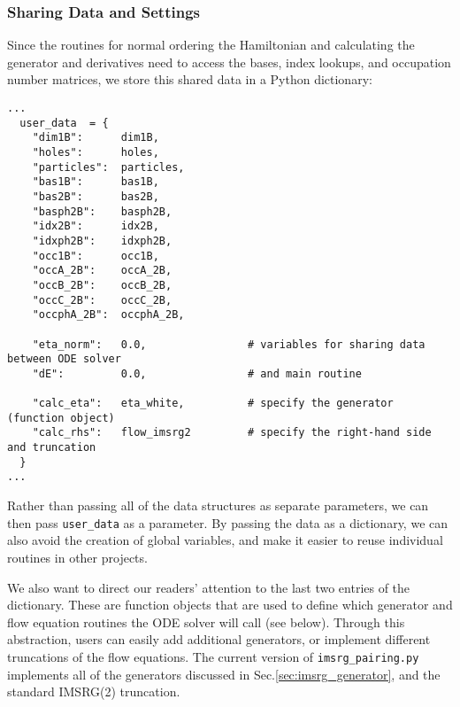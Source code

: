 \subsubsection*{Sharing Data and Settings}
Since the routines for normal ordering the Hamiltonian and calculating 
the generator and derivatives need to access the bases, index lookups,
and occupation number matrices, we store this shared data in a Python
dictionary:

\begin{lstlisting}
...
  user_data  = {
    "dim1B":      dim1B, 
    "holes":      holes,
    "particles":  particles,
    "bas1B":      bas1B,
    "bas2B":      bas2B,
    "basph2B":    basph2B,
    "idx2B":      idx2B,
    "idxph2B":    idxph2B,
    "occ1B":      occ1B,
    "occA_2B":    occA_2B,
    "occB_2B":    occB_2B,
    "occC_2B":    occC_2B,
    "occphA_2B":  occphA_2B,

    "eta_norm":   0.0,                # variables for sharing data between ODE solver
    "dE":         0.0,                # and main routine
    
    "calc_eta":   eta_white,          # specify the generator (function object)
    "calc_rhs":   flow_imsrg2         # specify the right-hand side and truncation
  }
...
\end{lstlisting}

Rather than passing all of the data structures as separate parameters, we
can then pass \texttt{user\_data} as a parameter. By passing the data as a
dictionary, we can also avoid the creation of global variables, and make
it easier to reuse individual routines in other projects.

We also want to direct our readers' attention to the last two entries of
the dictionary. These are function objects that are used to define which
generator and flow equation routines the ODE solver will call (see below).
Through this abstraction, users can easily add additional generators, or
implement different truncations of the flow equations. The current version
of \texttt{imsrg\_pairing.py} implements all of the generators discussed
in Sec.\ref{sec:imsrg_generator}, and the standard IMSRG(2) truncation.

